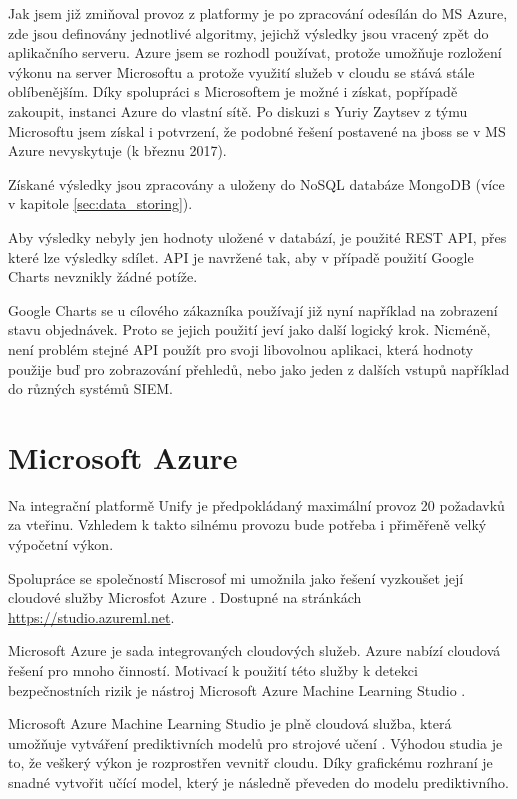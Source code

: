\documentclass[thesis=M,czech]{FITthesis}[2012/10/20]
\begin{document}
	Jak jsem již zmiňoval provoz z platformy je po zpracování odesílán do MS Azure, zde jsou definovány jednotlivé algoritmy, jejichž výsledky jsou vracený zpět do aplikačního serveru. Azure jsem se rozhodl používat, protože umožňuje rozložení výkonu na server Microsoftu a protože využití služeb v cloudu se stává stále oblíbenějším. Díky spolupráci s Microsoftem je možné i získat, popřípadě zakoupit, instanci Azure do vlastní sítě. Po diskuzi s Yuriy Zaytsev z týmu Microsoftu jsem získal i potvrzení, že podobné řešení postavené na jboss se v MS Azure nevyskytuje (k březnu 2017).
	
	Získané výsledky jsou zpracovány a uloženy do NoSQL databáze MongoDB (více v kapitole \ref{sec:data_storing}).
	
	Aby výsledky nebyly jen hodnoty uložené v databází, je použité REST API, přes které lze výsledky sdílet. API je navržené tak, aby v případě použití Google Charts nevznikly žádné potíže. 
	
	Google Charts se u cílového zákazníka používají již nyní například na zobrazení stavu objednávek. Proto se jejich použití jeví jako další logický krok. Nicméně, není problém stejné API použít pro svoji libovolnou aplikaci, která hodnoty použije buď pro zobrazování přehledů, nebo jako jeden z dalších vstupů například do různých systémů SIEM.

	\section{Microsoft Azure}
		\label{sec:ms_azure}
		Na integrační platformě Unify \cite{unify} je předpokládaný maximální provoz 20 požadavků za vteřinu. Vzhledem k takto silnému provozu bude potřeba i přiměřeně velký výpočetní výkon. 
			
		Spolupráce se společností Miscrosof \cite{microsoft} mi umožnila jako řešení vyzkoušet její cloudové služby Microsfot Azure \cite{msAzure}. Dostupné na stránkách \url{https://studio.azureml.net}.
			
		Microsoft Azure je sada integrovaných cloudových služeb. Azure nabízí cloudová řešení pro mnoho činností. Motivací k použití této služby k detekci bezpečnostních rizik je nástroj Microsoft Azure Machine Learning Studio \cite{msAzureStudio}.
			
		Microsoft Azure Machine Learning Studio je plně cloudová služba, která umožňuje vytváření prediktivních modelů pro strojové učení \cite{msAzureStudio}. Výhodou studia je to, že veškerý výkon je rozprostřen vevnitř cloudu. Díky grafickému rozhraní je snadné vytvořit učící model, který je následně převeden do modelu prediktivního.
			
\end{document}
